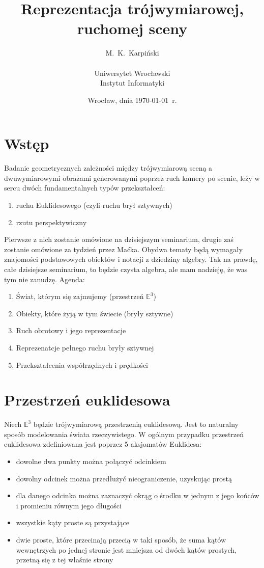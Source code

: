 \documentclass[a4paper,12pt]{article}
\title{Reprezentacja trójwymiarowej, ruchomej sceny}
\author{M.~K.~Karpiński\\
\\
Uniwersytet Wrocławski\\
Instytut Informatyki}
\date{Wrocław, dnia \today\ r.}
\newcommand{\E}{\mathbb{E}}
\begin{document}
\pagestyle{fancy}
\maketitle

\section{Wstęp}
\indent \indent Badanie geometrycznych zależności między trójwymiarową sceną a dwuwymiarowymi obrazami generowanymi poprzez ruch kamery po scenie, leży w sercu dwóch fundamentalnych typów przekształceń:

\begin{enumerate}
  \item ruchu Euklidesowego (czyli ruchu brył sztywnych)
  \item rzutu perspektywiczny
\end{enumerate}

Pierwsze z nich zostanie omówione na dzisiejszym seminarium, drugie zaś zostanie omówione za tydzień przez Maćka. Obydwa tematy będą wymagały znajomości podstawowych obiektów i notacji z dziedziny algebry. Tak na prawdę, całe dzisiejsze seminarium, to będzie czysta algebra, ale mam nadzieję, że was tym nie zanudzę. Agenda:

\begin{enumerate}
\item Świat, którym się zajmujemy (przestrzeń $\E^3$)
\item Obiekty, które żyją w tym świecie (bryły sztywne)
\item Ruch obrotowy i jego reprezentacje
\item Reprezenatcje pełnego ruchu bryły sztywnej 
\item Przekształcenia współrzędnych i prędkości
\end{enumerate}

\section{Przestrzeń euklidesowa}
\indent \indent Niech $\E^3$ będzie trójwymiarową przestrzenią euklidesową. Jest to naturalny sposób modelowania świata rzeczywistego. W ogólnym przypadku przestrzeń euklidesowa zdefiniowana jest poprzez 5 aksjomatów Euklidesa:

\begin{itemize}
\item dowolne dwa punkty można połączyć odcinkiem
\item dowolny odcinek można przedłużyć nieograniczenie, uzyskując prostą
\item dla danego odcinka można zaznaczyć okrąg o środku w jednym z jego końców i promieniu równym jego długości
\item wszystkie kąty proste są przystające
\item dwie proste, które przecinają przecią w taki sposób, że suma kątów wewnętrzych po jednej stronie jest mniejsza od dwóch kątów prostych, przetną się z tej właśnie strony
\end{itemize}
\end{document}
